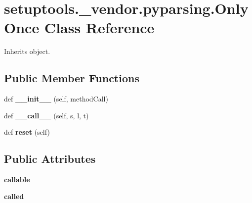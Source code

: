 \hypertarget{classsetuptools_1_1__vendor_1_1pyparsing_1_1_only_once}{}\section{setuptools.\+\_\+vendor.\+pyparsing.\+Only\+Once Class Reference}
\label{classsetuptools_1_1__vendor_1_1pyparsing_1_1_only_once}


Inherits object.

\subsection*{Public Member Functions}
\begin{DoxyCompactItemize}
\item 
\mbox{\label{classsetuptools_1_1__vendor_1_1pyparsing_1_1_only_once_a0c2ea369be2c0c26976d735de8edcfb7}} 
def {\bfseries \+\_\+\+\_\+init\+\_\+\+\_\+} (self, method\+Call)
\item 
\mbox{\label{classsetuptools_1_1__vendor_1_1pyparsing_1_1_only_once_ac252d23c28ac79dd583335b963831405}} 
def {\bfseries \+\_\+\+\_\+call\+\_\+\+\_\+} (self, s, l, t)
\item 
\mbox{\label{classsetuptools_1_1__vendor_1_1pyparsing_1_1_only_once_a5cf8d6511a3ea8030adf0bab3f45e54a}} 
def {\bfseries reset} (self)
\end{DoxyCompactItemize}
\subsection*{Public Attributes}
\begin{DoxyCompactItemize}
\item 
\mbox{\label{classsetuptools_1_1__vendor_1_1pyparsing_1_1_only_once_ad0452c5518c13dabf5477187d8868e4b}} 
{\bfseries callable}
\item 
\mbox{\label{classsetuptools_1_1__vendor_1_1pyparsing_1_1_only_once_ab9543043067f60b710c208278b3f0d62}} 
{\bfseries called}
\end{DoxyCompactItemize}


